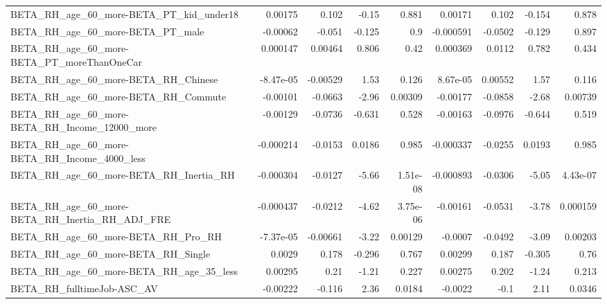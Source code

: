 \begin{tabular}{lrrrrrrrr}
BETA\_RH\_age\_60\_more-BETA\_PT\_kid\_under18            &     0.00175 &        0.102 &    -0.15 &    0.881 &    0.00171 &       0.102 &       -0.154 &         0.878 \\
BETA\_RH\_age\_60\_more-BETA\_PT\_male                   &    -0.00062 &       -0.051 &   -0.125 &      0.9 &  -0.000591 &     -0.0502 &       -0.129 &         0.897 \\
BETA\_RH\_age\_60\_more-BETA\_PT\_moreThanOneCar         &    0.000147 &      0.00464 &    0.806 &     0.42 &   0.000369 &      0.0112 &        0.782 &         0.434 \\
BETA\_RH\_age\_60\_more-BETA\_RH\_Chinese                &   -8.47e-05 &     -0.00529 &     1.53 &    0.126 &   8.67e-05 &     0.00552 &         1.57 &         0.116 \\
BETA\_RH\_age\_60\_more-BETA\_RH\_Commute                &    -0.00101 &      -0.0663 &    -2.96 &  0.00309 &   -0.00177 &     -0.0858 &        -2.68 &       0.00739 \\
BETA\_RH\_age\_60\_more-BETA\_RH\_Income\_12000\_more      &    -0.00129 &      -0.0736 &   -0.631 &    0.528 &   -0.00163 &     -0.0976 &       -0.644 &         0.519 \\
BETA\_RH\_age\_60\_more-BETA\_RH\_Income\_4000\_less       &   -0.000214 &      -0.0153 &   0.0186 &    0.985 &  -0.000337 &     -0.0255 &       0.0193 &         0.985 \\
BETA\_RH\_age\_60\_more-BETA\_RH\_Inertia\_RH             &   -0.000304 &      -0.0127 &    -5.66 & 1.51e-08 &  -0.000893 &     -0.0306 &        -5.05 &      4.43e-07 \\
BETA\_RH\_age\_60\_more-BETA\_RH\_Inertia\_RH\_ADJ\_FRE     &   -0.000437 &      -0.0212 &    -4.62 & 3.75e-06 &   -0.00161 &     -0.0531 &        -3.78 &      0.000159 \\
BETA\_RH\_age\_60\_more-BETA\_RH\_Pro\_RH                 &   -7.37e-05 &     -0.00661 &    -3.22 &  0.00129 &    -0.0007 &     -0.0492 &        -3.09 &       0.00203 \\
BETA\_RH\_age\_60\_more-BETA\_RH\_Single                 &      0.0029 &        0.178 &   -0.296 &    0.767 &    0.00299 &       0.187 &       -0.305 &          0.76 \\
BETA\_RH\_age\_60\_more-BETA\_RH\_age\_35\_less            &     0.00295 &         0.21 &    -1.21 &    0.227 &    0.00275 &       0.202 &        -1.24 &         0.213 \\
BETA\_RH\_fulltimeJob-ASC\_AV                         &    -0.00222 &       -0.116 &     2.36 &   0.0184 &    -0.0022 &        -0.1 &         2.11 &        0.0346 \\

\end{tabular}
